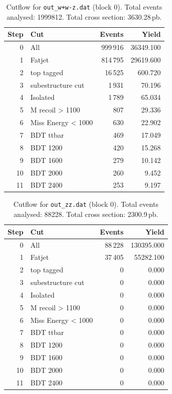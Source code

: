 \documentclass{article}
\begin{document}
\begin{table}[H]
\centering
\begin{tabular}{r l r r}
\toprule
Step & Cut & Events & Yield \\
\midrule
0 & All & 999\,916 & 36349.100 \\
1 & Fatjet & 814\,795 & 29619.600 \\
2 & top tagged & 16\,525 & 600.720 \\
3 & subestructure cut & 1\,931 & 70.196 \\
4 & Isolated & 1\,789 & 65.034 \\
5 & M recoil > 1100 & 807 & 29.336 \\
6 & Miss Energy < 1000 & 630 & 22.902 \\
7 & BDT ttbar & 469 & 17.049 \\
8 & BDT 1200 & 420 & 15.268 \\
9 & BDT 1600 & 279 & 10.142 \\
10 & BDT 2000 & 260 & 9.452 \\
11 & BDT 2400 & 253 & 9.197 \\
\bottomrule
\end{tabular}
\caption{Cutflow for \texttt{out\_w+w-z.dat} (block 0). Total events analysed: 1999812. Total cross section: 3630.28\,pb.}
\label{tab:cutflow-out-w-w-z-dat}
\end{table}

\begin{table}[H]
\centering
\begin{tabular}{r l r r}
\toprule
Step & Cut & Events & Yield \\
\midrule
0 & All & 88\,228 & 130395.000 \\
1 & Fatjet & 37\,405 & 55282.100 \\
2 & top tagged & 0 & 0.000 \\
3 & subestructure cut & 0 & 0.000 \\
4 & Isolated & 0 & 0.000 \\
5 & M recoil > 1100 & 0 & 0.000 \\
6 & Miss Energy < 1000 & 0 & 0.000 \\
7 & BDT ttbar & 0 & 0.000 \\
8 & BDT 1200 & 0 & 0.000 \\
9 & BDT 1600 & 0 & 0.000 \\
10 & BDT 2000 & 0 & 0.000 \\
11 & BDT 2400 & 0 & 0.000 \\
\bottomrule
\end{tabular}
\caption{Cutflow for \texttt{out\_zz.dat} (block 0). Total events analysed: 88228. Total cross section: 2300.9\,pb.}
\label{tab:cutflow-out-zz-dat}
\end{table}
\end{document}
